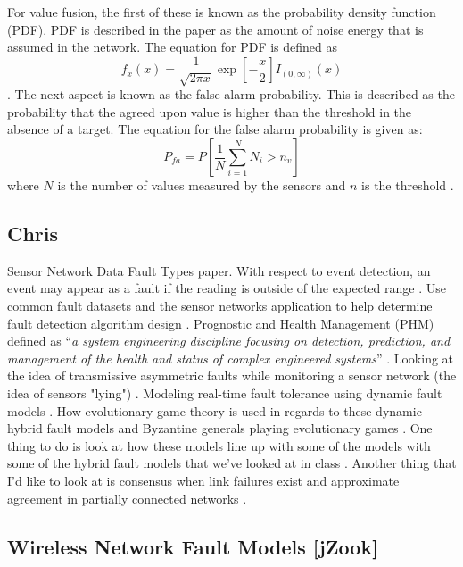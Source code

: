 \documentclass[twoside, conference]{IEEEtran}
\begin{document}
For value fusion, the first of these is known as the probability density function (PDF). PDF is described in the paper as the amount of noise energy that is assumed in the network. The equation for PDF is defined as
\begin{equation}
f_x(x)=\frac{1}{\sqrt{2\pi x}}\exp[-\frac{x}{2}]I_{(0,\infty)}(x) 
\end{equation}
\cite{clouqueur2004}. The next aspect is known as the false alarm probability. This is described as the probability that the agreed upon value is higher than the threshold in the absence of a target. The equation for the false alarm probability is given as:
\begin{equation}
P_{fa}=P[\frac{1}{N}\sum_{i=1}^{N}N_i>n_v]
\end{equation}
where $N$ is the number of values measured by the sensors and $n$ is the threshold \cite{clouqueur2004}.

\subsection{Chris}
Sensor Network Data Fault Types paper\cite{Ni2009}.  With respect to event detection, an event may appear as a fault if the reading is outside of the expected range \cite[p. 25:5]{Ni2009}.  Use common fault datasets and the sensor networks application to help determine fault detection algorithm design \cite[p. 25:7]{Ni2009}.  Prognostic and Health Management (PHM) defined as ``\textit{a system engineering discipline focusing on detection, prediction, and management of the health and status of complex engineered systems}'' \cite[p. 1]{Ma2009}.  Looking at the idea of transmissive asymmetric faults while monitoring a sensor network (the idea of sensors "lying") \cite[p. 4]{Ma2009}.  Modeling real-time fault tolerance using dynamic fault models \cite[p. 4]{Ma2009}\cite{Ma2008}.  How evolutionary game theory is used in regards to these dynamic hybrid fault models \cite[p. 6]{Ma2009} and Byzantine generals playing evolutionary games \cite[p. 11,15]{Ma2009}.  One thing to do is look at how these models line up with some of the models with some of the hybrid fault models that we've looked at in class \cite{Azadmanesh2000}.  Another thing that I'd like to look at is consensus when link failures exist \cite{Biely2011} and approximate agreement in partially connected networks \cite{Srinivasan2007}.


\subsection{Wireless Network Fault Models [jZook]}
\end{document}

